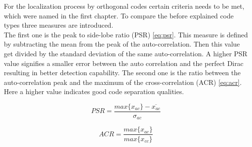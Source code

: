 For the localization process by orthogonal codes certain criteria needs to be met, which were named in the first chapter. To compare the before explained code types three measures are introduced. \\ 
The first one is the peak to side-lobe ratio (PSR) \ref{eq:psr}. This measure is defined by subtracting the mean from the peak of the auto-correlation. Then this value get divided by the standard deviation of the same auto-correlation. A higher PSR value signifies a smaller error between the auto correlation and the perfect Dirac resulting in better detection capability. The second one is the ratio between the auto-correlation peak and the maximum of the cross-correlation (ACR) \ref{eq:acr}. Here a higher value indicates good code separation qualities. 

\begin{equation}
PSR=\dfrac{max\{x_{ac}\}-\overline{x_{ac}}}{\sigma_{ac}}
\label{eq:psr}
\end{equation}

\begin{equation}
ACR=\dfrac{max\{x_{ac}\}}{max\{{x_{cc}\}}}
\label{eq:acr}
\end{equation}

%
%
%
%
%

